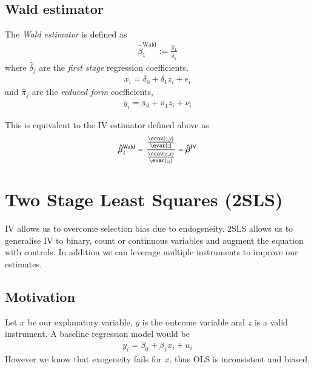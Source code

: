         \subsection{Wald estimator}\label{def:endogeneity/Wald}
            \begin{definition}
                The \textit{Wald estimator} is defined as
                \begin{align*}
                    \hat\beta_1^\mathrm{Wald} := \frac{\hat\pi_1}{\hat \delta_1}
                \end{align*}
                where $\hat\delta_j$ are the \textit{first stage} regression coefficients,
                \begin{align}
                    x_i = \delta_0 + \delta_1 z_i + e_i 
                \end{align}
                and $\hat\pi_j$ are the \textit{reduced form} coefficients,
                \begin{align}
                    y_i = \pi_0 + \pi_1 z_i + \nu_i
                \end{align}
            \end{definition}
            
            This is equivalent to the IV estimator defined above as
            \begin{align}
                \hat\beta_1^\mathrm{Wald} = \frac{\frac{\ecov{z,y}}{\evar{z}}}{\frac{\ecov{z,x}}{\evar{z_i}}} = \hat\beta^\mathrm{IV}
            \end{align}

        
    \section{Two Stage Least Squares (2SLS)}
    
        IV allows us to overcome selection bias due to endogeneity. 2SLS allows us to generalise IV to binary, count or continuous variables and augment the equation with controls. In addition we can leverage multiple instruments to improve our estimates.

        \subsection{Motivation}
            Let $x$ be our explanatory variable, $y$ is the outcome variable and $z$ is a valid instrument. A baseline regression model would be
            \begin{align}
                y_i = \beta_0 + \beta_1 x_i + u_i
            \end{align}
            However we know that exogeneity fails for $x$, thus OLS is inconsistent and biased.
            
